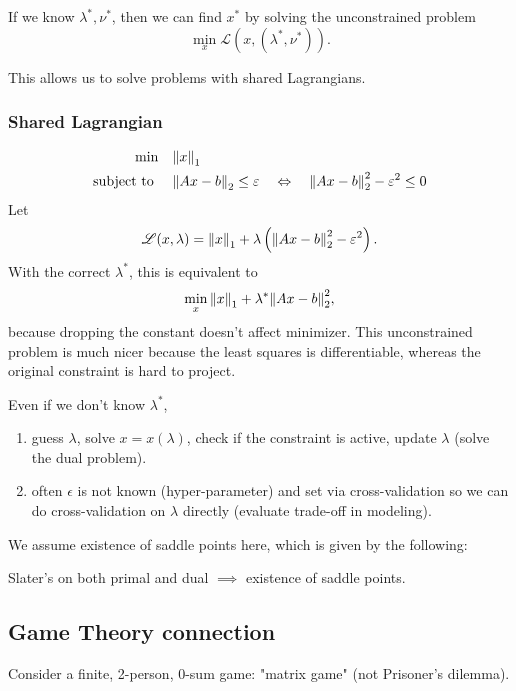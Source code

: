 \documentclass[class=article,crop=false]{standalone}
\begin{document}
\begin{coro}
	If we know $ \lambda^* ,\nu^* $, then we can find $ x^* $ by solving the unconstrained problem
	\[
		\min_x \mathscr{L}(x,(\lambda^* ,\nu^* ))
	.\] 
\end{coro}
This allows us to solve problems with shared Lagrangians.
\subsubsection{Shared Lagrangian}
\begin{eg}
\begin{align*}
\min\quad &{\left\lVert{ x}\right\rVert}_1  \\ 
\text{subject to } \quad & {\left\lVert{ Ax-b}\right\rVert}_2 \leq \varepsilon \quad \Leftrightarrow \quad {\left\lVert{ Ax-b}\right\rVert}_2^2 - \varepsilon^2 \leq 0 
\end{align*}
Let
\[
	\mathscr{L}(x,\lambda) = {\left\lVert{ x}\right\rVert}_1 + \lambda \left( {\left\lVert{ Ax-b}\right\rVert}_2^2 - \varepsilon^2  \right) 
.\]
With the correct $ \lambda^* $, this is equivalent to
\[
\min_x {\left\lVert{ x}\right\rVert}_1 + \lambda^* {\left\lVert{ Ax-b}\right\rVert}_2^2
,\]
because dropping the constant doesn't affect minimizer. This unconstrained problem is much nicer because the least squares is differentiable, whereas the original constraint is hard to project.

\end{eg}

Even if we don't know $ \lambda^* $,
\begin{enumerate}[label=(\arabic*)]
	\item guess $ \lambda$, solve $ x = x(\lambda)$, check if the constraint is active, update $ \lambda$ (solve the dual problem).
	\item often $ \epsilon$ is not known (hyper-parameter) and set via cross-validation so we can do cross-validation on $ \lambda$ directly (evaluate trade-off in modeling).
\end{enumerate}
We assume existence of saddle points here, which is given by the following:
\begin{prop}
Slater's on both primal and dual $ \implies$ existence of saddle points. 
\end{prop}

\subsection{Game Theory connection}
Consider a finite, 2-person, 0-sum game: "matrix game" (not Prisoner's dilemma). 
\end{document}
